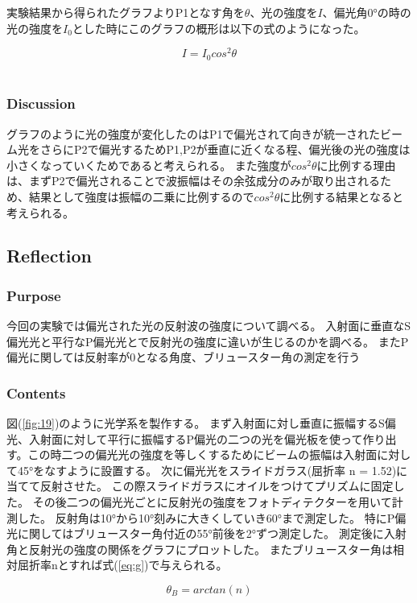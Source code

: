 \documentclass[11pt, a4paper]{jsarticle}
\begin{document}
実験結果から得られたグラフよりP1となす角を$\theta$、光の強度を$I$、偏光角0°の時の光の強度を$I_0$とした時にこのグラフの概形は以下の式のようになった。

\begin{equation}
    I = I_0cos^2\theta \label{eq:g}
\end{equation}\\
\subsubsection{Discussion}
グラフのように光の強度が変化したのはP1で偏光されて向きが統一されたビーム光をさらにP2で偏光するためP1,P2が垂直に近くなる程、偏光後の光の強度は小さくなっていくためであると考えられる。
また強度が$cos^2\theta$に比例する理由は、まずP2で偏光されることで波振幅はその余弦成分のみが取り出されるため、結果として強度は振幅の二乗に比例するので$cos^2\theta$に比例する結果となると考えられる。
\subsection{Reflection}
\subsubsection{Purpose}
今回の実験では偏光された光の反射波の強度について調べる。
入射面に垂直なS偏光光と平行なP偏光光とで反射光の強度に違いが生じるのかを調べる。
またP偏光に関しては反射率が0となる角度、ブリュースター角の測定を行う
\subsubsection{Contents}
図(\ref{fig:19})のように光学系を製作する。
まず入射面に対し垂直に振幅するS偏光、入射面に対して平行に振幅するP偏光の二つの光を偏光板を使って作り出す。この時二つの偏光光の強度を等しくするためにビームの振幅は入射面に対して45°をなすように設置する。
次に偏光光をスライドガラス(屈折率 n = 1.52)に当てて反射させた。
この際スライドガラスにオイルをつけてプリズムに固定した。
その後二つの偏光光ごとに反射光の強度をフォトディテクターを用いて計測した。
反射角は10°から10°刻みに大きくしていき60°まで測定した。
特にP偏光に関してはブリュースター角付近の55°前後を2°ずつ測定した。
測定後に入射角と反射光の強度の関係をグラフにプロットした。
またブリュースター角は相対屈折率nとすれば式(\ref{eq:g})で与えられる。

\begin{equation}
    \theta_B = arctan(n) \label{eq:h}
\end{equation}\\
\end{document}
